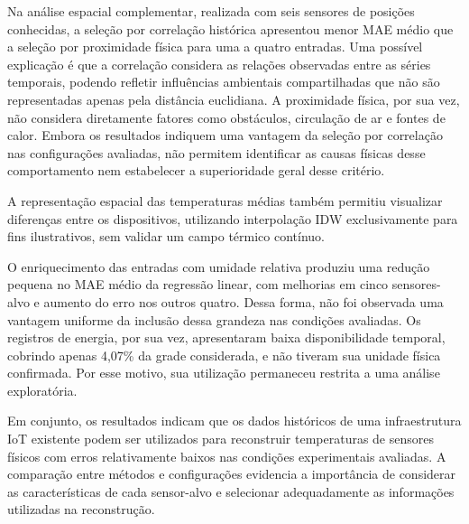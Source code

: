
Na análise espacial complementar, realizada com seis sensores
de posições conhecidas, a seleção por correlação histórica
apresentou menor MAE médio que a seleção por proximidade
física para uma a quatro entradas. Uma possível explicação
é que a correlação considera as relações observadas entre
as séries temporais, podendo refletir influências ambientais
compartilhadas que não são representadas apenas pela distância
euclidiana. A proximidade física, por sua vez, não considera
diretamente fatores como obstáculos, circulação de ar e fontes
de calor. Embora os resultados indiquem uma vantagem da
seleção por correlação nas configurações avaliadas, não
permitem identificar as causas físicas desse comportamento
nem estabelecer a superioridade geral desse critério.

A representação espacial das temperaturas médias também
permitiu visualizar diferenças entre os dispositivos,
utilizando interpolação IDW exclusivamente para fins
ilustrativos, sem validar um campo térmico contínuo.

O enriquecimento das entradas com umidade relativa produziu
uma redução pequena no MAE médio da regressão linear, com
melhorias em cinco sensores-alvo e aumento do erro nos
outros quatro. Dessa forma, não foi observada uma vantagem
uniforme da inclusão dessa grandeza nas condições avaliadas.
Os registros de energia, por sua vez, apresentaram baixa
disponibilidade temporal, cobrindo apenas 4,07\% da grade
considerada, e não tiveram sua unidade física confirmada.
Por esse motivo, sua utilização permaneceu restrita a uma
análise exploratória.

Em conjunto, os resultados indicam que os dados históricos
de uma infraestrutura IoT existente podem ser utilizados
para reconstruir temperaturas de sensores físicos com
erros relativamente baixos nas condições experimentais
avaliadas. A comparação entre métodos e configurações
evidencia a importância de considerar as características
de cada sensor-alvo e selecionar adequadamente as
informações utilizadas na reconstrução.

